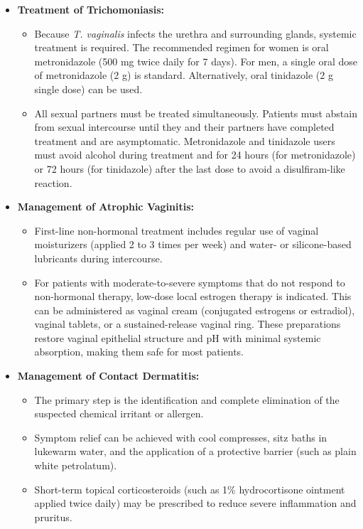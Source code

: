 \begin{itemize}
    \item \textbf{Treatment of Trichomoniasis:}
    \begin{itemize}
        \item Because \textit{T. vaginalis} infects the urethra and surrounding glands, systemic treatment is required. The recommended regimen for women is oral metronidazole (500 mg twice daily for 7 days). For men, a single oral dose of metronidazole (2 g) is standard. Alternatively, oral tinidazole (2 g single dose) can be used.
        \item All sexual partners must be treated simultaneously. Patients must abstain from sexual intercourse until they and their partners have completed treatment and are asymptomatic. Metronidazole and tinidazole users must avoid alcohol during treatment and for 24 hours (for metronidazole) or 72 hours (for tinidazole) after the last dose to avoid a disulfiram-like reaction.
    \end{itemize}
    \item \textbf{Management of Atrophic Vaginitis:}
    \begin{itemize}
        \item First-line non-hormonal treatment includes regular use of vaginal moisturizers (applied 2 to 3 times per week) and water- or silicone-based lubricants during intercourse.
        \item For patients with moderate-to-severe symptoms that do not respond to non-hormonal therapy, low-dose local estrogen therapy is indicated. This can be administered as vaginal cream (conjugated estrogens or estradiol), vaginal tablets, or a sustained-release vaginal ring. These preparations restore vaginal epithelial structure and pH with minimal systemic absorption, making them safe for most patients.
    \end{itemize}
    \item \textbf{Management of Contact Dermatitis:}
    \begin{itemize}
        \item The primary step is the identification and complete elimination of the suspected chemical irritant or allergen.
        \item Symptom relief can be achieved with cool compresses, sitz baths in lukewarm water, and the application of a protective barrier (such as plain white petrolatum).
        \item Short-term topical corticosteroids (such as 1\% hydrocortisone ointment applied twice daily) may be prescribed to reduce severe inflammation and pruritus.

\end{itemize}
\end{itemize}
